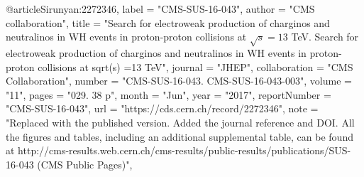 @article{Sirunyan:2272346,
      label          = "CMS-SUS-16-043",
      author        = "{CMS collaboration}",
      title         = "{Search for electroweak production of charginos and
                       neutralinos in WH events in proton-proton collisions at $
                       \sqrt{s}=13 $ TeV. Search for electroweak production of
                       charginos and neutralinos in WH events in proton-proton
                       collisions at sqrt(s) =13 TeV}",
      journal       = "JHEP",
      collaboration = "CMS Collaboration",
      number        = "CMS-SUS-16-043. CMS-SUS-16-043-003",
      volume        = "11",
      pages         = "029. 38 p",
      month         = "Jun",
      year          = "2017",
      reportNumber  = "CMS-SUS-16-043",
      url           = "https://cds.cern.ch/record/2272346",
      note          = "Replaced with the published version. Added the journal
                       reference and DOI. All the figures and tables, including an
                       additional supplemental table, can be found at
                       http://cms-results.web.cern.ch/cms-results/public-results/publications/SUS-16-043
                       (CMS Public Pages)",
}

